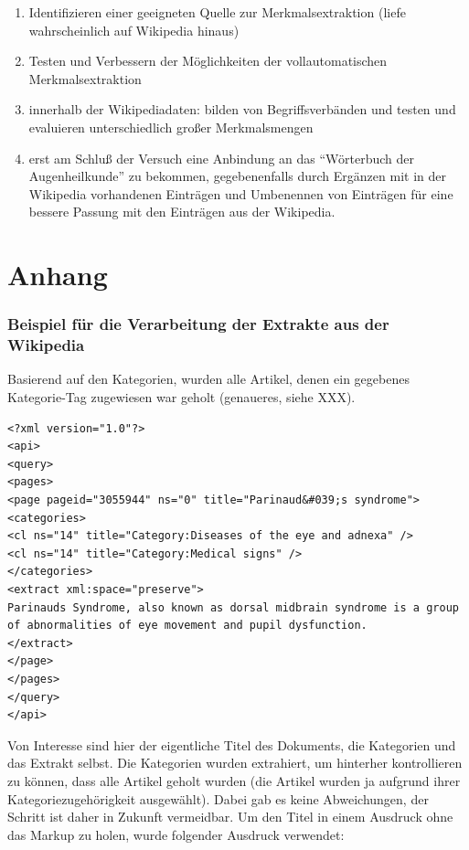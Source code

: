 \documentclass[pagesize,DIV=calc,12pt,final]{scrreprt}
\begin{document}
\begin{enumerate}
    \item Identifizieren einer geeigneten Quelle zur Merkmalsextraktion (liefe wahrscheinlich auf Wikipedia hinaus)
    \item Testen und Verbessern der Möglichkeiten der vollautomatischen Merkmalsextraktion
    \item innerhalb der Wikipediadaten: bilden von Begriffsverbänden und testen und evaluieren unterschiedlich großer Merkmalsmengen
    \item erst am Schluß der Versuch eine Anbindung an das \enquote{Wörterbuch der Augenheilkunde} zu bekommen, gegebenenfalls durch Ergänzen mit in der Wikipedia vorhandenen Einträgen und Umbenennen von Einträgen für eine bessere Passung mit den Einträgen aus der Wikipedia.
\end{enumerate}


\chapter{Anhang}

\subsection{Beispiel für die Verarbeitung der Extrakte aus der Wikipedia}

Basierend auf den Kategorien, wurden alle Artikel, denen ein gegebenes Kategorie-Tag zugewiesen war geholt (genaueres, siehe XXX).

\lstset{
language=XML
}

\begin{lstlisting}
<?xml version="1.0"?>
<api>
<query>
<pages>
<page pageid="3055944" ns="0" title="Parinaud&#039;s syndrome">
<categories>
<cl ns="14" title="Category:Diseases of the eye and adnexa" />
<cl ns="14" title="Category:Medical signs" />
</categories>
<extract xml:space="preserve">
Parinauds Syndrome, also known as dorsal midbrain syndrome is a group of abnormalities of eye movement and pupil dysfunction.
</extract>
</page>
</pages>
</query>
</api>
\end{lstlisting}

Von Interesse sind hier der eigentliche Titel des Dokuments, die Kategorien und das Extrakt selbst. 
Die Kategorien wurden extrahiert, um hinterher kontrollieren zu können, dass alle Artikel geholt wurden (die Artikel wurden ja aufgrund ihrer Kategoriezugehörigkeit ausgewählt). 
Dabei gab es keine Abweichungen, der Schritt ist daher in Zukunft vermeidbar. 
Um den Titel in einem Ausdruck ohne das Markup zu holen, wurde folgender Ausdruck verwendet: 
\end{document}
